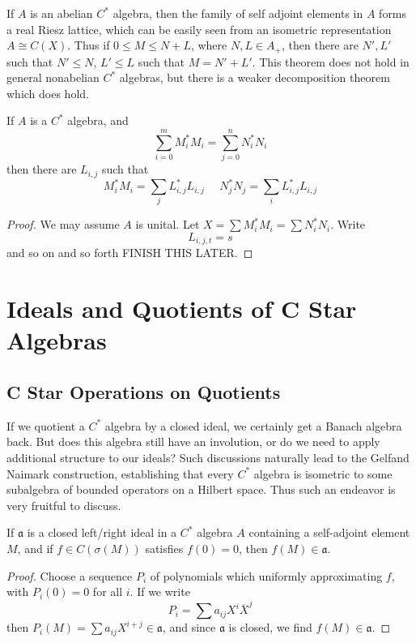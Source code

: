 If $A$ is an abelian $C^*$ algebra, then the family of self adjoint elements in $A$ forms a real Riesz lattice, which can be easily seen from an isometric representation $A \cong C(X)$. Thus if $0 \leq M \leq N + L$, where $N,L \in A_+$, then there are $N',L'$ such that $N' \leq N$, $L' \leq L$ such that $M = N' + L'$. This theorem does not hold in general nonabelian $C^*$ algebras, but there is a weaker decomposition theorem which does hold.

\begin{prop}
    If $A$ is a $C^*$ algebra, and
    \[ \sum_{i = 0}^m M_i^* M_i = \sum_{j = 0}^n N_i^* N_i \]
    then there are $L_{i,j}$ such that
    \[ M_i^* M_i = \sum_j L_{i,j}^* L_{i,j}\ \ \ \ \ \ N_j^* N_j = \sum_i L_{i,j}^* L_{i,j} \]
\end{prop}
\begin{proof}
    We may assume $A$ is unital. Let $X = \sum M_i^* M_i = \sum N_i^* N_i$. Write
    \[ L_{i,j,t} = s \]
    and so on and so forth FINISH THIS LATER.
\end{proof}







\section{Ideals and Quotients of C Star Algebras}

\subsection{C Star Operations on Quotients}

If we quotient a $C^*$ algebra by a closed ideal, we certainly get a Banach algebra back. But does this algebra still have an involution, or do we need to apply additional structure to our ideals? Such discussions naturally lead to the Gelfand Naimark construction, establishing that every $C^*$ algebra is isometric to some subalgebra of bounded operators on a Hilbert space. Thus such an endeavor is very fruitful to discuss.

\begin{prop}
    If $\mathfrak{a}$ is a closed left/right ideal in a $C^*$ algebra $A$ containing a self-adjoint element $M$, and if $f \in C(\sigma(M))$ satisfies $f(0) = 0$, then $f(M) \in \mathfrak{a}$.
\end{prop}
\begin{proof}
    Choose a sequence $P_i$ of polynomials which uniformly approximating $f$, with $P_i(0) = 0$ for all $i$. If we write
    \[ P_i = \sum a_{ij} X^i \overline{X}^j \]
    then $P_i(M) = \sum a_{ij} X^{i+j} \in \mathfrak{a}$, and since $\mathfrak{a}$ is closed, we find $f(M) \in \mathfrak{a}$.
\end{proof}

